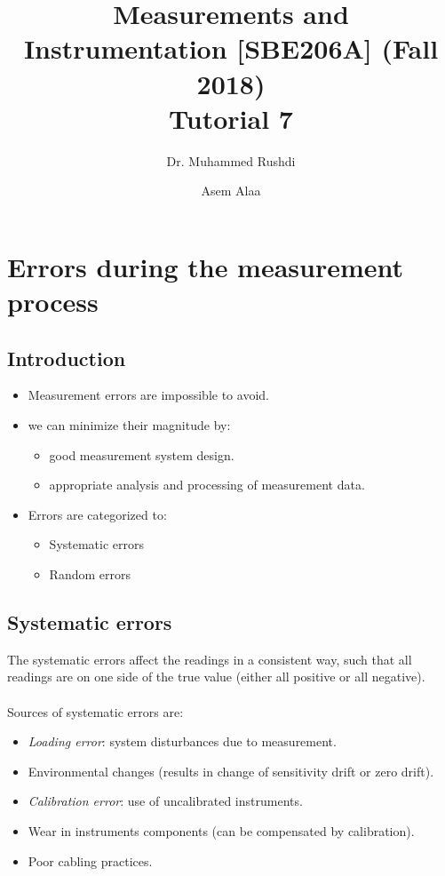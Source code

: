 \documentclass[a4paper,11pt,dvipsnames]{book}
\begin{document}
\author{Dr. Muhammed Rushdi \and Asem Alaa}

\title{Measurements and Instrumentation [SBE206A] (Fall 2018)\\ Tutorial 7}

\maketitle


\chapter*{Errors during the measurement process}

\section*{Introduction}
\begin{itemize}
\item Measurement errors are impossible to avoid.
\item we can minimize their magnitude by: 
\begin{itemize}
\item good measurement system design.
\item appropriate analysis and processing of measurement data.
\end{itemize} 
\item Errors are categorized to:
\begin{itemize}
\item Systematic errors
\item Random errors
\end{itemize}
\end{itemize}

\section*{Systematic errors}

The systematic errors affect the readings in a consistent way, such that all readings are on one side of the true value (either all positive or all negative).\\
\\
Sources of systematic errors are:
\begin{itemize}
\item \emph{Loading error}: system disturbances due to measurement.
\item Environmental changes (results in change of sensitivity drift or zero drift).
\item \emph{Calibration error}: use of uncalibrated instruments.
\item Wear in instruments components (can be compensated by calibration).
\item Poor cabling practices.
\end{itemize}
\end{document}
